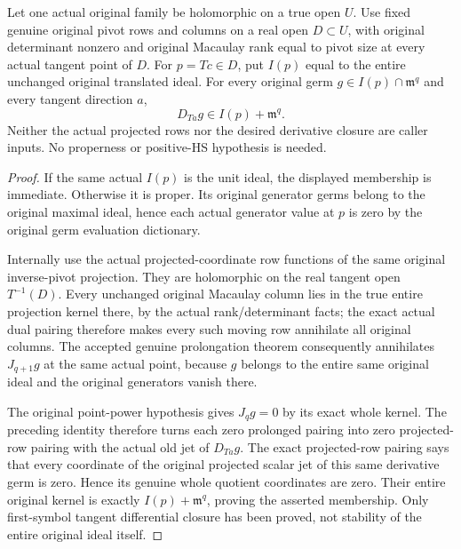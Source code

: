 \begin{theorem}
\label{hir:actual-original-centre-frame-first-symbol-tangent-closure}
\leanok
Let one actual original family be holomorphic on a true open $U$.
Use fixed genuine original pivot rows and columns on a real open
$D\subset U$, with original determinant nonzero and original Macaulay
rank equal to pivot size at every actual tangent point of $D$.
For $p=Tc\in D$, put $I(p)$ equal to the entire unchanged original
translated ideal. For every original germ
$g\in I(p)\cap\mathfrak m^q$ and every tangent direction $a$,
\[
 D_{Ta}g\in I(p)+\mathfrak m^q.
\]
Neither the actual projected rows nor the desired derivative closure
are caller inputs. No properness or positive-HS hypothesis is needed.
\end{theorem}
\begin{proof}
If the same actual $I(p)$ is the unit ideal, the displayed membership
is immediate. Otherwise it is proper. Its original generator germs
belong to the original maximal ideal, hence each actual generator
value at $p$ is zero by the original germ evaluation dictionary.

Internally use the actual projected-coordinate row functions of the
same original inverse-pivot projection. They are holomorphic on the
real tangent open $T^{-1}(D)$. Every unchanged original Macaulay
column lies in the true entire projection kernel there, by the
actual rank/determinant facts; the exact actual dual pairing therefore
makes every such moving row annihilate all original columns.
The accepted genuine prolongation theorem consequently annihilates
$J_{q+1}g$ at the same actual point, because $g$ belongs to the entire
same original ideal and the original generators vanish there.

The original point-power hypothesis gives $J_qg=0$ by its exact whole
kernel. The preceding identity therefore turns each zero prolonged
pairing into zero projected-row pairing with the actual old jet of
$D_{Ta}g$. The exact projected-row pairing says that every coordinate
of the original projected scalar jet of this same derivative germ is
zero. Hence its genuine whole quotient coordinates are zero. Their
entire original kernel is exactly $I(p)+\mathfrak m^q$, proving the
asserted membership. Only first-symbol tangent differential closure
has been proved, not stability of the entire original ideal itself.
\end{proof}

